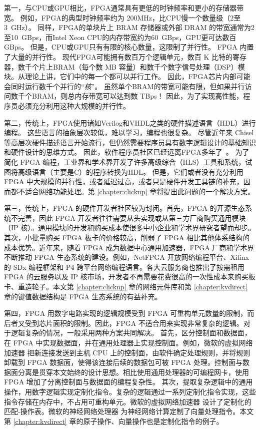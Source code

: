 第一，与CPU或GPU相比，FPGA通常具有更低的时钟频率和更小的存储器带宽。
例如，FPGA的典型时钟频率约为 200MHz，比CPU慢一个数量级（2至3~GHz）。
同样，FPGA的单块片上 BRAM 存储器或外部 DRAM 的带宽通常为2至10~GBps，而Intel Xeon CPU的内存带宽约为60~GBps，GPU更可达数百 GBps。
但是，CPU或GPU只有有限的核心数量，这限制了并行性。
FPGA 内置了大量的并行性。
现代FPGA可能拥有数百万个逻辑单元，数百 K 比特的寄存器，数千个片上BRAM（每个数 MB 容量）和数千个数字信号处理（DSP）模块。从理论上讲，它们中的每一个都可以并行工作。
因此，FPGA芯片内部可能会同时运行数千个并行的``\textit {核}''。
虽然单个BRAM的带宽可能有限，但如果并行访问数千个BRAM，则总内存带宽可以达到数 TBps！
因此，为了实现高性能，程序员必须充分利用这种大规模的并行性。

第二，传统上，FPGA使用诸如Verilog和VHDL之类的硬件描述语言（HDL）进行编程。
这些语言的抽象层次较低，难以学习，编程也很复杂。
尽管近年来 Chisel \cite{bachrach2012chisel} 等高层次硬件描述语言开始流行，但仍然需要程序员具有数字逻辑设计的基础知识和硬件设计的思维方式。
因此，软件程序员社区已经远离FPGA多年了~\cite {bacon2013fpga}。
为了简化 FPGA 编程，工业界和学术界开发了许多高级综合（HLS）工具和系统，试图将高级语言（主要是C）的程序转换为HDL。
但是，它们或者没有充分利用 FPGA 中大规模的并行性，或者延迟过高，或者只是硬件开发工具链的补充，因而都不适合网络功能处理。第 \ref{chapter:clicknp} 章将提出此问题的一个解决方案。

第三，传统上，FPGA 的硬件开发者社区较为封闭。首先，FPGA 的开源生态系统不完善，因此 FPGA 开发者往往需要从头实现或从第三方厂商购买通用模块（IP 核）。通用模块的开发和购买成本使很多中小企业和学术界研究者望而却步。其次，小批量购买 FPGA 板卡的价格较高，削弱了 FPGA 相比其他体系结构的成本优势。近年来，随着 FPGA 成为数据中心通用加速器，FPGA 厂商和学术界不断推动 FPGA 生态系统的建设。例如，NetFPGA \cite{netfpga} 开放网络编程平台、Xilinx 的 SDx \cite{sdaccel} 编程框架和 P4 \cite{bosshart2014p4} 跨平台网络编程语言。各大云服务商也推出了按需租用 FPGA 的云服务以及 IP 核市场，开发者不再需要花费很高的一次性成本来购买板卡、重造轮子。本文第 \ref{chapter:clicknp} 章的网络元件库和第 \ref{chapter:kvdirect} 章的键值数据结构是 FPGA 生态系统的有益补充。

第四，FPGA 用数字电路实现的逻辑规模受到 FPGA 可重构单元数量的限制，而后者又受到芯片面积的限制。因此，FPGA 不适合用来实现非常复杂的逻辑。对于逻辑复杂的情况，一般采用两种方案共同解决。
首先，区分控制面和数据面，在 FPGA 中实现数据面，并在通用处理器上实现控制面。例如，微软的虚拟网络加速器 \cite{smartnic} 把新连接发送到主机 CPU 上的控制面，由软件确定处理规则，并将规则卸载到 FPGA 数据面，使得该连接后续的数据包可被 FPGA 处理。控制面与数据面分离是贯穿本文始终的设计思想。相比使用通用处理器的可编程网卡，使用 FPGA 增加了分离控制面与数据面的编程复杂性。
其次，提取复杂逻辑中的通用操作，用数字逻辑实现定制化指令。复杂的逻辑通过一系列定制化指令实现，这些指令存储在内存中，不占用可重构单元。微软的虚拟网络加速器 \cite{smartnic} 设计了定制化的匹配-操作表。微软的神经网络处理器 \cite{accelerating-deep-convolutional-neural-networks-using-specialized-hardware} 为神经网络计算定制了向量处理指令。本文第 \ref{chapter:kvdirect} 章的原子操作、向量操作也是定制化指令的例子。

